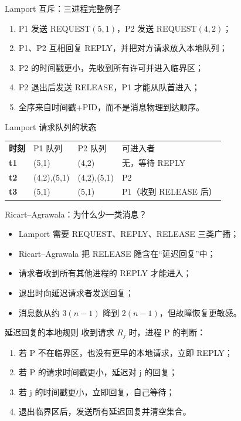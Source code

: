 \documentclass[UTF8,fontset=none,aspectratio=169,10pt]{beamer}
\begin{document}

\begin{frame}{Lamport 互斥：三进程完整例子}
\begin{enumerate}
  \item P1 发送 REQUEST$(5,1)$，P2 发送 REQUEST$(4,2)$；
  \item P1、P2 互相回复 REPLY，并把对方请求放入本地队列；
  \item P2 的时间戳更小，先收到所有许可并进入临界区；
  \item P2 退出后发送 RELEASE，P1 才能从队首进入；
  \item 全序来自时间戳+PID，而不是消息物理到达顺序。
\end{enumerate}
\end{frame}

\begin{frame}{Lamport 请求队列的状态}
\begin{tabularx}{\linewidth}{>{\bfseries}p{2.2cm}XXX}
\toprule
时刻 & P1 队列 & P2 队列 & 可进入者 \\
t1 & (5,1) & (4,2) & 无，等待 REPLY \\
t2 & (4,2),(5,1) & (4,2),(5,1) & P2 \\
t3 & (5,1) & (5,1) & P1（收到 RELEASE 后） \\
\bottomrule
\end{tabularx}
\vfill
{}
\end{frame}

\begin{frame}{Ricart--Agrawala：为什么少一类消息？}
\begin{itemize}
  \item Lamport 需要 REQUEST、REPLY、RELEASE 三类广播；
  \item Ricart--Agrawala 把 RELEASE 隐含在“延迟回复”中；
  \item 请求者收到所有其他进程的 REPLY 才能进入；
  \item 退出时向延迟请求者发送回复；
  \item 消息数从约 $3(n-1)$ 降到 $2(n-1)$，但故障恢复更敏感。
\end{itemize}
\end{frame}

\begin{frame}{延迟回复的本地规则}
收到请求 $R_j$ 时，进程 P 的判断：
\begin{enumerate}
  \item 若 P 不在临界区，也没有更早的本地请求，立即 REPLY；
  \item 若 P 的请求时间戳更小，延迟对 j 的回复；
  \item 若 j 的时间戳更小，立即回复，自己等待；
  \item 退出临界区后，发送所有延迟回复并清空集合。
\end{enumerate}
\end{frame}
\end{document}
